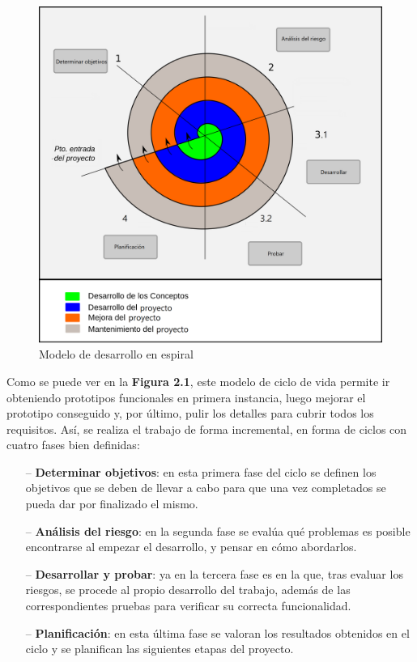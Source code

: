 \begin{figure}[H]
  \begin{center}
    \includegraphics[width=0.9\linewidth]{figures/modelo_espiral.png}
		\caption{Modelo de desarrollo en espiral}
		\label{fig.espiral}
		\end{center}
\end{figure}

Como se puede ver en la \textbf{Figura 2.1}, este modelo de ciclo de vida permite ir obteniendo prototipos funcionales en primera instancia, luego mejorar el prototipo conseguido y, por último, pulir los detalles para cubrir todos los requisitos.  Así, se realiza el trabajo de forma incremental, en forma de ciclos con cuatro fases bien definidas:

\begin{itemize}
	\item[--] \textbf{Determinar objetivos}: en esta primera fase del ciclo se definen los objetivos que se deben de llevar a cabo para que una vez completados se pueda dar por finalizado el mismo.
	\item[--] \textbf{Análisis del riesgo}: en la segunda fase se evalúa qué problemas es posible encontrarse al empezar el desarrollo, y pensar en cómo abordarlos.
	\item[--] \textbf{Desarrollar y probar}: ya en la tercera fase es en la que, tras evaluar los riesgos, se procede al propio desarrollo del trabajo, además de las correspondientes pruebas para verificar su correcta funcionalidad.
	\item[--] \textbf{Planificación}: en esta última fase se valoran los resultados obtenidos en el ciclo y se planifican las siguientes etapas del proyecto.
\end{itemize}


